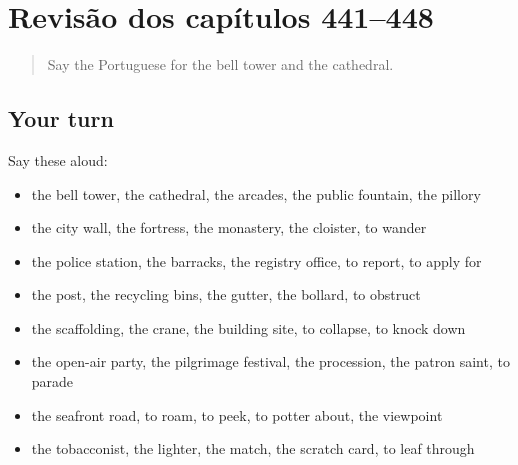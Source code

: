 \section[(dialogue)]{Revisão dos capítulos 441–448}

\label{lesson:PT-R448-revisao-441-448}



\begin{quote}
Say the Portuguese for the bell tower and the cathedral.
\end{quote}

\subsection*{Your turn}
Say these aloud:

\begin{itemize}
\raggedright
  \item the bell tower, the cathedral, the arcades, the public fountain, the pillory
  \item the city wall, the fortress, the monastery, the cloister, to wander
  \item the police station, the barracks, the registry office, to report, to apply for
  \item the post, the recycling bins, the gutter, the bollard, to obstruct
  \item the scaffolding, the crane, the building site, to collapse, to knock down
  \item the open-air party, the pilgrimage festival, the procession, the patron saint, to parade
  \item the seafront road, to roam, to peek, to potter about, the viewpoint
  \item the tobacconist, the lighter, the match, the scratch card, to leaf through
\end{itemize}

